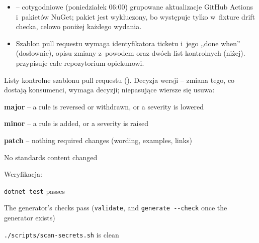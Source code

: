 \begin{itemize}
         pozostaje głośnym obejściem, a~CI i~tak zablokuje
        push. Znalezisko hook rozpoznaje po kodzie wyjścia 2 (), bo
        gitleaks zwraca 1 zarówno dla znaleziska, jak i~dla błędu użycia; każdy inny kod
        niezerowy to awaria narzędzia, przy której commit także jest odrzucany („a scanner
        that did not run proves nothing”), z~podpowiedzią
        \texttt{./scripts/scan-secrets.sh -{}-staged}. Przy fałszywym alarmie hook radzi wąski
        wpis allowlisty w~ z~komentarzem, podczas gdy
         i~podsumowanie joba CI każą przeredagować przykład zamiast
        dodawać wyjątek dla ścieżki.  odtwarza skan CI
        lokalnie: bez argumentu -- cała historia (to, co uruchamia CI),
         -- zmiany w~stagingu (to, co uruchamia hook), 
        -- drzewo robocze bez historii; nieznany tryb kończy się instrukcją użycia i~kodem 2.
  \item {} -- cotygodniowe (poniedziałek 06:00) grupowane
        aktualizacje GitHub Actions i~pakietów NuGet; pakiet  jest
        wykluczony, bo występuje tylko w~fixture drift checka, celowo poniżej każdego wydania.
  \item Szablon pull requestu wymaga identyfikatora ticketu i~jego „done when” (dosłownie),
        opisu zmiany z~powodem oraz dwóch list kontrolnych (niżej).
         przypisuje całe repozytorium opiekunowi.
\end{itemize}

Listy kontrolne szablonu pull requestu (). Decyzja
wersji -- zmiana tego, co dostają konsumenci, wymaga decyzji; niepasujące wiersze się usuwa:

\begin{checklista}
  \item \textbf{major} -- a rule is reversed or withdrawn, or a severity is lowered
  \item \textbf{minor} -- a rule is added, or a severity is raised
  \item \textbf{patch} -- nothing required changes (wording, examples, links)
  \item No standards content changed
\end{checklista}

Weryfikacja:

\begin{checklista}
  \item \texttt{dotnet test} passes
  \item The generator's checks pass (\texttt{validate}, and \texttt{generate -{}-check} once the
        generator exists)
  \item \texttt{./scripts/scan-secrets.sh} is clean
\end{checklista}

